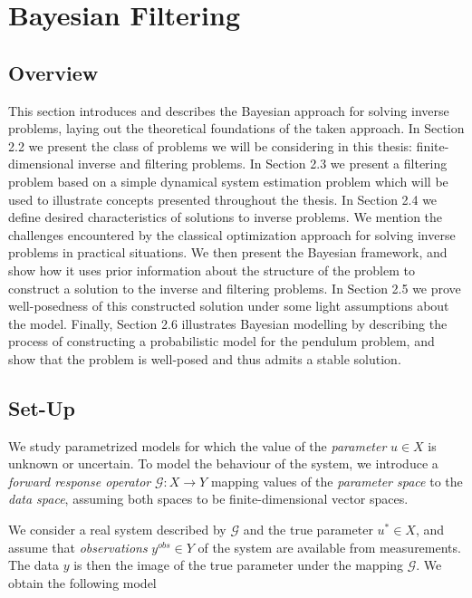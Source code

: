 \section{Bayesian Filtering}
\subsection{Overview}

This section introduces and describes the Bayesian approach for solving inverse problems, laying out the theoretical foundations of the taken approach. In Section 2.2 we present the class of problems we will be considering in this thesis: finite-dimensional inverse and filtering problems. In Section 2.3 we present a filtering problem based on a simple dynamical system estimation problem which will be used to illustrate concepts presented throughout the thesis. In Section 2.4 we define desired characteristics of solutions to inverse problems. We mention the challenges encountered by the classical optimization approach for solving inverse problems in practical situations. We then present the Bayesian framework, and show how it uses prior information about the structure of the problem to construct a solution to the inverse and filtering problems. In Section 2.5 we prove well-posedness of this constructed solution under some light assumptions about the model. Finally, Section 2.6 illustrates Bayesian modelling by describing the process of constructing a probabilistic model for the pendulum problem, and show that the problem is well-posed and thus admits a stable solution.

\subsection{Set-Up}

We study parametrized models for which the value of the \textit{parameter} $u \in X$ is unknown or uncertain. To model the behaviour of the system, we introduce a \textit{forward response operator} $\mathcal{G} : X \rightarrow Y$ mapping values of the \textit{parameter space} to the \textit{data space}, assuming both spaces to be finite-dimensional vector spaces.

We consider a real system described by $\mathcal{G}$ and the true parameter $u^* \in X$, and assume that \textit{observations} $y^{obs} \in Y$ of the system are available from measurements. The data $y$ is then the image of the true parameter under the mapping $\mathcal{G}$. We obtain the following model

